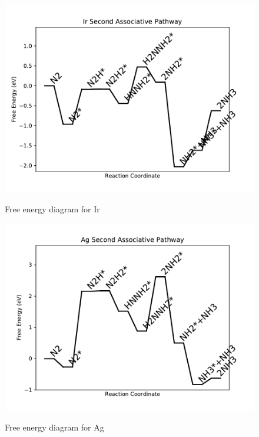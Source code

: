 \documentclass[journal=jacsat,manuscript=article]{achemso}
\begin{document}
\begin{figure}
\includegraphics[width=1\linewidth]{data/plots/Ir_associative_2.pdf}
\label{fig:Ir_associative_2}
\caption{Free energy diagram for Ir}
\end{figure}

\newpage
\begin{figure}
\includegraphics[width=1\linewidth]{data/plots/Ag_associative_2.pdf}
\label{fig:Ag_associative_2}
\caption{Free energy diagram for Ag}
\end{figure}
\end{document}
